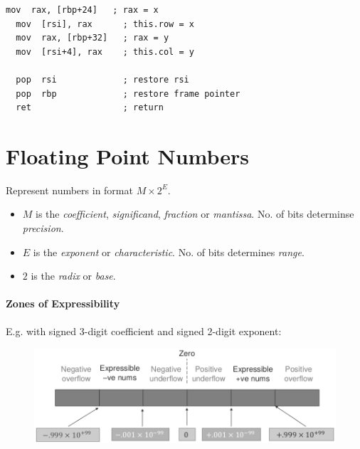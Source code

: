 \documentclass[twocolumn,english]{article}
\begin{document}
\begin{table}[H]
\begin{minipage}[t]{0.3\textwidth}
\begin{centering}
\begin{lstlisting}[basicstyle={\scriptsize\ttfamily},breaklines=true,keywords={loop, exit, when, end}]
  mov  rax, [rbp+24]   ; rax = x
  mov  [rsi], rax      ; this.row = x
  mov  rax, [rbp+32]   ; rax = y
  mov  [rsi+4], rax    ; this.col = y

  pop  rsi             ; restore rsi
  pop  rbp             ; restore frame pointer
  ret                  ; return
\end{lstlisting}

\par\end{centering}

\noindent \centering{}\end{minipage}
\end{table}



\section{Floating Point Numbers}

Represent numbers in format $M\times2^{E}$.
\begin{itemize}
\item $M$ is the \emph{coefficient}, \emph{significand}, \emph{fraction}
or \emph{mantissa}. No. of bits determinse \emph{precision}.
\item $E$ is the \emph{exponent} or \emph{characteristic}. No. of bits
determines \emph{range}.
\item $2$ is the \emph{radix} or \emph{base}.
\end{itemize}

\paragraph{Zones of Expressibility}

E.g. with signed 3-digit coefficient and signed 2-digit exponent:

\begin{figure}[H]
\noindent \centering{}\includegraphics[scale=0.3]{img/floatrange}
\end{figure}
\end{document}
